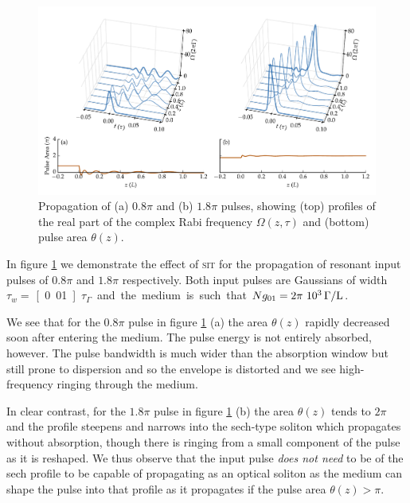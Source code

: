     \begin{figure}[]
      \includegraphics[width=\linewidth]
        {figs/03_nonlinear/coh_gaus_plot_0_8pi_1_8pi_fwhm0_010_N01000_fig1.pdf}
      \caption{
      Propagation of (a) $0.8 \pi$ and (b) $1.8 \pi$ pulses, showing (top)
      profiles of the real part of the complex Rabi frequency $\Omega(z, \tau)$
      and (bottom) pulse area $\theta(z)$.
      }
      \label{fig:sit_08_18_nodecay}
    \end{figure}

    In figure \ref{fig:sit_08_18_nodecay} we demonstrate the effect of
    \textsc{sit} for the propagation of resonant input pulses of $0.8 \pi$ and
    $1.8 \pi$ respectively. Both input pulses are Gaussians of width $\tau_w = $
    \unit[0.01]{$\tau_\Gamma$} and the medium is such that $Ng_{01} =
    \unit[2\pi~10^3]{\Gamma/L}$.

    We see that for the $0.8 \pi$ pulse in figure \ref{fig:sit_08_18_nodecay}
    (a) the area $\theta(z)$ rapidly decreased soon after entering the medium.
    The pulse energy is not entirely absorbed, however. The pulse bandwidth is
    much wider than the absorption window but still prone to dispersion and so
    the envelope is distorted and we see high-frequency ringing through the
    medium.

    In clear contrast, for the $1.8 \pi$ pulse in figure
    \ref{fig:sit_08_18_nodecay} (b) the area $\theta(z)$ tends to $2\pi$ and the
    profile steepens and narrows into the sech-type soliton which propagates
    without absorption, though there is ringing from a small component of the
    pulse as it is reshaped. We thus observe that the input pulse \textit{does
    not need} to be of the sech profile to be capable of propagating as an
    optical soliton as the medium can shape the pulse into that profile as it
    propagates if the pulse area $\theta(z) > \pi$.\cite{allen1975optical}

